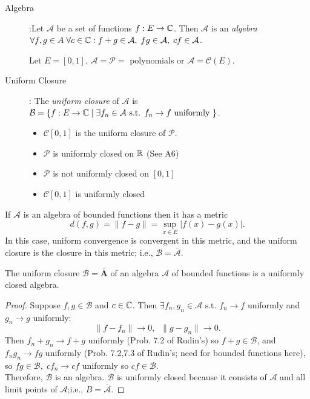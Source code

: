 \begin{define}[28]
	\hfill
	\begin{description}
		\item[Algebra]:Let $\mathcal{A}$ be a set of functions $f:E\to \mathbb{C}$. Then $\mathcal{A}$ is an \textit{algebra} $\forall{f,g \in A}\;\forall{c \in \ensuremath{\mathbb{C}}}: f+g \in \mathcal{A}, \; fg \in \mathcal{A}, \; cf \in \mathcal{A}$.
		      \begin{example}
			      Let $E=[0,1]$, $\mathcal{A}=\mathcal{P}=$ polynomials or $\mathcal{A}=\mathcal{C}(E)$.
		      \end{example}
		\item[Uniform Closure]: The \textit{uniform closure} of $\mathcal{A}$ is $\mathcal{B}=\{f: E\to \mathbb{C} \;| \; \exists{f_{n} \in \mathcal{A}} \text{ s.t. } f_{n}\to f \text{ uniformly }\} $.
		      \begin{example}
			      \begin{itemize}
				      \item $\mathcal{C}[0,1]$ is the uniform closure of $\mathcal{P}$.
				      \item $\mathcal{P}$ is uniformly closed on $\mathbb{R}$ (See A6)
				      \item $\mathcal{P}$ is not uniformly closed on $[0,1]$
				      \item $\mathcal{C}[0,1]$ is uniformly closed
			      \end{itemize}
		      \end{example}
	\end{description}
	\begin{note}
		If $\mathcal{A}$ is an algebra of bounded functions then it has a metric
		\[
			d(f,g)= \|f-g\|=\sup_{x \in E}{\left|f(x)-g(x)\right|}
			.\]
		In this case, uniform convergence is convergent in this metric, and the uniform closure is the closure in this metric; i.e., $\mathcal{B}=\overline{\mathcal{A}}$.
	\end{note}
\end{define}
\begin{thm}[29]
	The uniform closure $\mathcal{B}=\mathbf{\overline{A}}$ of an algebra $\mathcal{A}$ of bounded functions is a uniformly closed algebra.
	\begin{proof}
		Suppose $f,g \in \mathcal{B}$ and $c \in \mathbb{C}$. Then $\exists{f_{n},g_{n} \in \mathcal{A}} \text{ s.t. } f_{n}\to f$ uniformly and $g_{n}\to g$ uniformly:
		\[
			\|f-f_{n}\|	\to 0, \;\; \|g-g_{n}\|\to 0
			.\]
		Then $f_{n}+g_{n}\to f+g$ uniformly (Prob. 7.2 of Rudin's) so $f+g \in \mathcal{B}$, and $f_{n} g_{n} \to fg$ uniformly (Prob. 7.2,7.3 of Rudin's; need for bounded functions here), so $fg \in \mathcal{B},\; c f_n \to cf$ uniformly so $cf \in \mathcal{B}$.\\
		Therefore, $\mathcal{B}$ is an algebra.
		$\mathcal{B}$ is uniformly closed because it consists of $\mathcal{A}$ and all limit points of $\mathcal{A}$;i.e., $B=\overline{\mathcal{A}}$.
	\end{proof}
\end{thm}

